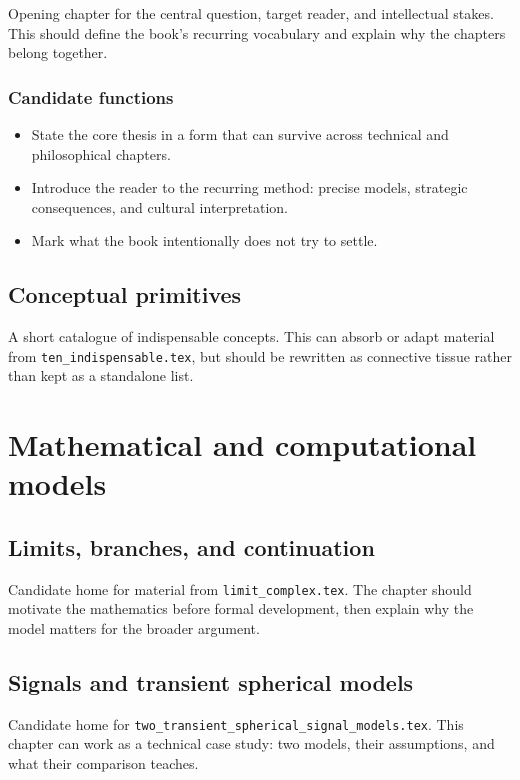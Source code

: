 \documentclass[11pt,twoside,openright]{book}
\begin{document}
Opening chapter for the central question, target reader, and intellectual
stakes. This should define the book's recurring vocabulary and explain why the
chapters belong together.

\section{Candidate functions}

\begin{itemize}
  \item State the core thesis in a form that can survive across technical and
        philosophical chapters.
  \item Introduce the reader to the recurring method: precise models, strategic
        consequences, and cultural interpretation.
  \item Mark what the book intentionally does not try to settle.
\end{itemize}

\chapter{Conceptual primitives}

A short catalogue of indispensable concepts. This can absorb or adapt material
from \texttt{ten\_indispensable.tex}, but should be rewritten as connective
tissue rather than kept as a standalone list.

\part{Mathematical and computational models}

\chapter{Limits, branches, and continuation}

Candidate home for material from \texttt{limit\_complex.tex}. The chapter should
motivate the mathematics before formal development, then explain why the model
matters for the broader argument.

\chapter{Signals and transient spherical models}

Candidate home for \texttt{two\_transient\_spherical\_signal\_models.tex}. This
chapter can work as a technical case study: two models, their assumptions, and
what their comparison teaches.
\end{document}
